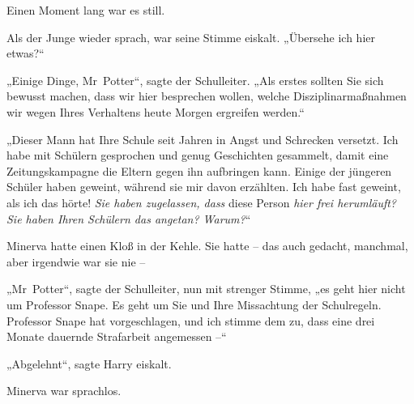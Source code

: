 Einen Moment lang war es still. 

Als der Junge wieder sprach, war seine Stimme eiskalt. „Übersehe ich hier etwas?“ 

„Einige Dinge, Mr~Potter“, sagte der Schulleiter. „Als erstes sollten Sie sich bewusst machen, dass wir hier besprechen wollen, welche Disziplinarmaßnahmen wir wegen Ihres Verhaltens heute Morgen ergreifen werden.“ 

„Dieser Mann hat Ihre Schule seit Jahren in Angst und Schrecken versetzt. Ich habe mit Schülern gesprochen und genug Geschichten gesammelt, damit eine Zeitungskampagne die Eltern gegen ihn aufbringen kann. Einige der jüngeren Schüler haben geweint, während sie mir davon erzählten. Ich habe fast geweint, als ich das hörte! \emph{Sie haben zugelassen, dass} diese Person \emph{hier frei herumläuft? Sie haben Ihren Schülern das angetan? Warum?}“ 

Minerva hatte einen Kloß in der Kehle. Sie hatte – das auch gedacht, manchmal, aber irgendwie war sie nie – 

„Mr~Potter“, sagte der Schulleiter, nun mit strenger Stimme, „es geht hier nicht um Professor Snape. Es geht um Sie und Ihre Missachtung der Schulregeln. Professor Snape hat vorgeschlagen, und ich stimme dem zu, dass eine drei Monate dauernde Strafarbeit angemessen –“ 

„Abgelehnt“, sagte Harry eiskalt. 

Minerva war sprachlos. 

